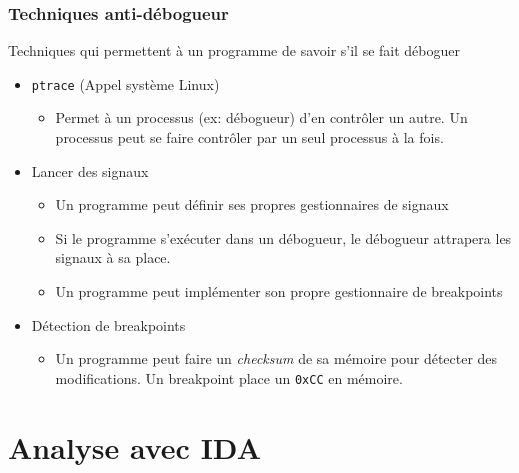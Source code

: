 \documentclass[10pt,xcolor={table,dvipsnames},t]{beamer}
\begin{document}
\begin{frame}
    \frametitle{Techniques anti-débogueur}
    Techniques qui permettent à un programme de savoir s'il se fait déboguer
    
    \begin{itemize}
        \item \texttt{ptrace} (Appel système Linux)
        \begin{itemize}
            \item Permet à un processus (ex: débogueur) d'en contrôler un autre. Un processus peut se faire contrôler par un seul processus à la fois. 
        \end{itemize}
        
        \item Lancer des signaux
        \begin{itemize}
            \item Un programme peut définir ses propres gestionnaires de signaux
            \item Si le programme s'exécuter dans un débogueur, le débogueur attrapera les signaux à sa place.
            \item Un programme peut implémenter son propre gestionnaire de breakpoints
        \end{itemize}
        
        \item Détection de breakpoints
        \begin{itemize}
            \item Un programme peut faire un \textit{checksum} de sa mémoire pour détecter des modifications. Un breakpoint place un \texttt{0xCC} en mémoire.
        \end{itemize}
        
    \end{itemize}
\end{frame}



\section{Analyse avec IDA}
\end{document}
